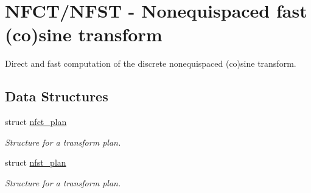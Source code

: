 \hypertarget{group__nfsct}{
\section{NFCT/NFST - Nonequispaced fast (co)sine transform}
\label{group__nfsct}
}
Direct and fast computation of the discrete nonequispaced (co)sine transform.  
\subsection*{Data Structures}
\begin{CompactItemize}
\item 
struct \hyperlink{structnfct__plan}{nfct\_\-plan}
\begin{CompactList}\small\item\em Structure for a transform plan. \item\end{CompactList}\item 
struct \hyperlink{structnfst__plan}{nfst\_\-plan}
\begin{CompactList}\small\item\em Structure for a transform plan. \item\end{CompactList}\end{CompactItemize}
